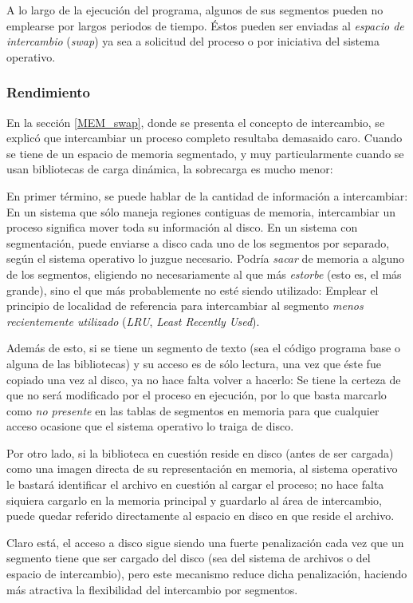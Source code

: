 \documentclass[11pt,fleqn]{book} %
\begin{document}
A lo largo de la ejecución del programa, algunos de sus segmentos
pueden no emplearse por largos periodos de tiempo. Éstos 
pueden ser enviadas al \emph{espacio de intercambio} (\emph{swap}) ya sea a
solicitud del proceso o por iniciativa del sistema operativo.
\subsubsection{Rendimiento}
\label{sec-5-3-2-1}


En la sección \ref{MEM_swap}, donde se presenta el concepto de
intercambio, se explicó que intercambiar un proceso completo
resultaba demasaido caro. Cuando se tiene de un espacio de memoria
segmentado, y muy particularmente cuando se usan bibliotecas de
carga dinámica, la sobrecarga es mucho menor:

En primer término, se puede hablar de la cantidad de información a
intercambiar: En un sistema que sólo maneja regiones contiguas de
memoria, intercambiar un proceso significa mover toda su información
al disco. En un sistema con segmentación, puede enviarse a disco 
cada uno de los segmentos por separado, según el sistema operativo 
lo juzgue necesario. Podría \emph{sacar} de memoria a alguno de los segmentos, 
eligiendo no necesariamente al que más \emph{estorbe} (esto es, el más grande), 
sino el que más probablemente no esté siendo utilizado: Emplear el principio
de localidad de referencia para intercambiar al segmento \emph{menos recientemente utilizado} (\emph{LRU}, \emph{Least Recently Used}).

Además de esto, si se tiene  un segmento de texto (sea el código
programa base o alguna de las bibliotecas) y su acceso es de sólo
lectura, una vez que éste fue copiado una vez al disco, ya no hace
falta volver a hacerlo: Se tiene la certeza de que no será modificado
por el proceso en ejecución, por lo que basta marcarlo como \emph{no presente} en las tablas de segmentos en memoria para que cualquier
acceso ocasione que el sistema operativo lo traiga de disco.

Por otro lado, si la biblioteca en cuestión reside en disco (antes de
ser cargada) como una imagen directa de su representación en memoria,
al sistema operativo le bastará identificar el archivo en cuestión al
cargar el proceso; no hace falta siquiera cargarlo en la memoria
principal y guardarlo al área de intercambio, puede quedar referido
directamente al espacio en disco en que reside el archivo.

Claro está, el acceso a disco sigue siendo una fuerte penalización
cada vez que un segmento tiene que ser cargado del disco (sea del
sistema de archivos o del espacio de intercambio), pero este mecanismo
reduce dicha penalización, haciendo más atractiva la flexibilidad del
intercambio por segmentos.
\end{document}
